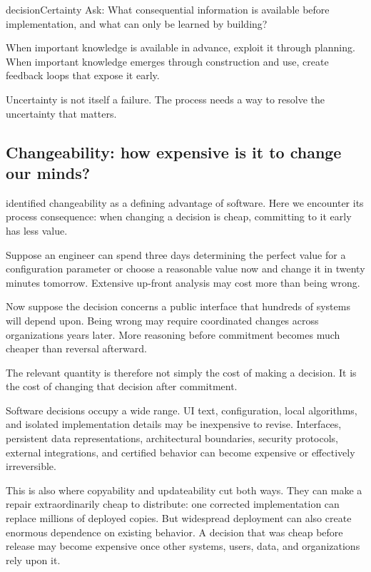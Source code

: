 \begin{bookbox}{decision}{Certainty} %
Ask: What consequential information is available before implementation, and what can only be learned by
building?

When important knowledge is available in advance, exploit it through planning. When important knowledge
emerges through construction and use, create feedback loops that expose it early.
\end{bookbox}

Uncertainty is not itself a failure. The process needs a way to resolve the uncertainty that matters.

\subsection{Changeability: how expensive is it to change our minds?}\label{sec-changeability}

\citet{ch-software-engineering} identified changeability as a defining advantage of software. Here we encounter
its process consequence: when changing a decision is cheap, committing to it early has less value.

Suppose an engineer can spend three days determining the perfect value for a configuration parameter or
choose a reasonable value now and change it in twenty minutes tomorrow. Extensive up-front analysis may
cost more than being wrong.

Now suppose the decision concerns a public interface that hundreds of systems will depend upon. Being
wrong may require coordinated changes across organizations years later. More reasoning before commitment
becomes much cheaper than reversal afterward.

The relevant quantity is therefore not simply the cost of making a decision. It is the cost of changing
that decision after commitment.

Software decisions occupy a wide range. UI text, configuration, local algorithms, and isolated
implementation details may be inexpensive to revise. Interfaces, persistent data representations,
architectural boundaries, security protocols, external integrations, and certified behavior can become
expensive or effectively irreversible.

This is also where copyability and updateability cut both ways. They can make a repair extraordinarily
cheap to distribute: one corrected implementation can replace millions of deployed copies. But widespread
deployment can also create enormous dependence on existing behavior. A decision that was cheap before
release may become expensive once other systems, users, data, and organizations rely upon it.

